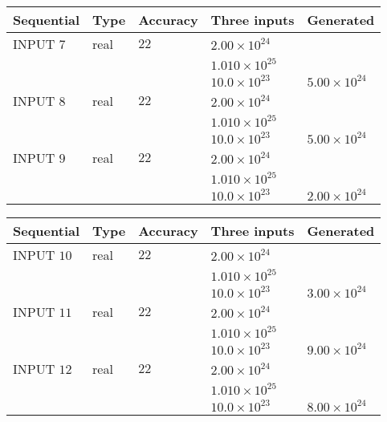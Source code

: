 \documentclass[12pt]{article}
\begin{document}
   
  
  
\noindent\begin{tabular}{|l|l|l|l|l|}
\hline
 Sequential & Type & Accuracy & Three inputs & Generated \\ 
\hline
 
 
  INPUT $           7$ & real & $          22 $ & $
 2.00 \times 10^{24}
  $ & \\
  & & &  $
 1.010 \times 10^{25}
  $ & \\
  & & &  $
 10.0 \times 10^{23}
 $ & $ 5.00 \times 10^{24} $ 
 \\  \hline  
 
 
  INPUT $           8$ & real & $          22 $ & $
 2.00 \times 10^{24}
  $ & \\
  & & &  $
 1.010 \times 10^{25}
  $ & \\
  & & &  $
 10.0 \times 10^{23}
 $ & $ 5.00 \times 10^{24} $ 
 \\  \hline  
 
 
  INPUT $           9$ & real & $          22 $ & $
 2.00 \times 10^{24}
  $ & \\
  & & &  $
 1.010 \times 10^{25}
  $ & \\
  & & &  $
 10.0 \times 10^{23}
 $ & $ 2.00 \times 10^{24} $ 
 \\  \hline  
 \end{tabular}
   
   
  
  
\noindent\begin{tabular}{|l|l|l|l|l|}
\hline
 Sequential & Type & Accuracy & Three inputs & Generated \\ 
\hline
 
 
  INPUT $          10$ & real & $          22 $ & $
 2.00 \times 10^{24}
  $ & \\
  & & &  $
 1.010 \times 10^{25}
  $ & \\
  & & &  $
 10.0 \times 10^{23}
 $ & $ 3.00 \times 10^{24} $ 
 \\  \hline  
 
 
  INPUT $          11$ & real & $          22 $ & $
 2.00 \times 10^{24}
  $ & \\
  & & &  $
 1.010 \times 10^{25}
  $ & \\
  & & &  $
 10.0 \times 10^{23}
 $ & $ 9.00 \times 10^{24} $ 
 \\  \hline  
 
 
  INPUT $          12$ & real & $          22 $ & $
 2.00 \times 10^{24}
  $ & \\
  & & &  $
 1.010 \times 10^{25}
  $ & \\
  & & &  $
 10.0 \times 10^{23}
 $ & $ 8.00 \times 10^{24} $ 
 \\  \hline  
 \end{tabular}
   
\end{document}
